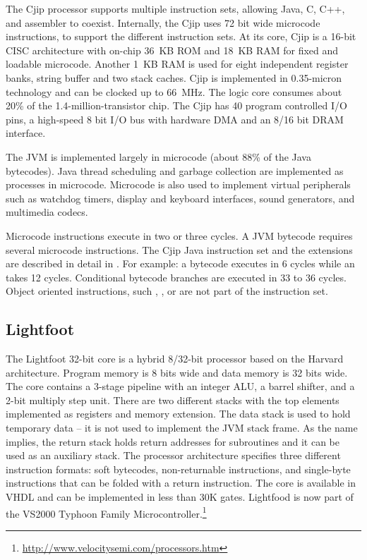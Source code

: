 The Cjip processor \cite{Imsys, Cjip} supports multiple instruction
sets, allowing Java, C, C++, and assembler to coexist. Internally,
the Cjip uses 72 bit wide microcode instructions, to support the
different instruction sets. At its core, Cjip is a 16-bit CISC
architecture with on-chip 36~KB ROM and 18~KB RAM for fixed and
loadable microcode. Another 1~KB RAM is used for eight independent
register banks, string buffer and two stack caches. Cjip is
implemented in 0.35-micron technology and can be clocked up to
66~MHz. The logic core consumes about 20\% of the
1.4-million-transistor chip. The Cjip has 40 program controlled I/O
pins, a high-speed 8 bit I/O bus with hardware DMA and an 8/16 bit
DRAM interface.


The JVM is implemented largely in microcode (about 88\% of the Java
bytecodes). Java thread scheduling and garbage collection are
implemented as processes in microcode. Microcode is also used to
implement virtual peripherals such as watchdog timers, display and
keyboard interfaces, sound generators, and multimedia codecs.

Microcode instructions execute in two or three cycles. A JVM bytecode
requires several microcode instructions. The Cjip Java instruction
set and the extensions are described in detail in \cite{CjipRef}. For
example: a bytecode  executes in 6 cycles while an
 takes 12 cycles. Conditional bytecode branches are
executed in 33 to 36 cycles. Object oriented instructions, such
, , or  are not
part of the instruction set.



\subsection{Lightfoot}

The Lightfoot 32-bit core \cite{Lightfoot} is a hybrid 8/32-bit
processor based on the Harvard architecture. Program memory is 8 bits
wide and data memory is 32 bits wide. The core contains a 3-stage
pipeline with an integer ALU, a barrel shifter, and a 2-bit multiply
step unit. There are two different stacks with the top elements
implemented as registers and memory extension. The data stack is used
to hold temporary data -- it is not used to implement the JVM stack
frame. As the name implies, the return stack holds return addresses
for subroutines and it can be used as an auxiliary stack. The
processor architecture specifies three different instruction formats:
soft bytecodes, non-returnable instructions, and single-byte
instructions that can be folded with a return instruction. The core
is available in VHDL and can be implemented in less than 30K gates.
Lightfood is now part of the VS2000 Typhoon Family
Microcontroller.\footnote{\url{http://www.velocitysemi.com/processors.htm}}

